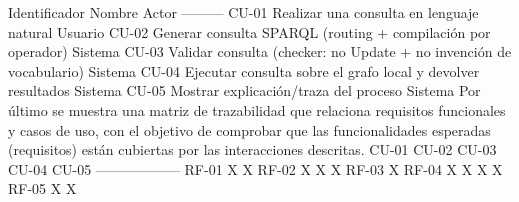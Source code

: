 {}\markdownRendererInterblockSeparator
{}\markdownRendererPipe{} Identificador \markdownRendererPipe{} Nombre \markdownRendererPipe{} Actor \markdownRendererPipe{} \markdownRendererPipe{}---\markdownRendererPipe{}---\markdownRendererPipe{}---\markdownRendererPipe{} \markdownRendererPipe{} CU-01 \markdownRendererPipe{} Realizar una consulta en lenguaje natural \markdownRendererPipe{} Usuario \markdownRendererPipe{} \markdownRendererPipe{} CU-02 \markdownRendererPipe{} Generar consulta SPARQL (routing + compilación por operador) \markdownRendererPipe{} Sistema \markdownRendererPipe{} \markdownRendererPipe{} CU-03 \markdownRendererPipe{} Validar consulta (checker: no Update + no invención de vocabulario) \markdownRendererPipe{} Sistema \markdownRendererPipe{} \markdownRendererPipe{} CU-04 \markdownRendererPipe{} Ejecutar consulta sobre el grafo local y devolver resultados \markdownRendererPipe{} Sistema \markdownRendererPipe{} \markdownRendererPipe{} CU-05 \markdownRendererPipe{} Mostrar explicación/traza del proceso \markdownRendererPipe{} Sistema \markdownRendererPipe{}\markdownRendererInterblockSeparator
{}\markdownRendererInterblockSeparator
{}Por último se muestra una matriz de trazabilidad que relaciona requisitos funcionales y casos de uso, con el objetivo de comprobar que las funcionalidades esperadas (requisitos) están cubiertas por las interacciones descritas.\markdownRendererInterblockSeparator
{}\markdownRendererInterblockSeparator
{}\markdownRendererPipe{} \markdownRendererPipe{} CU-01 \markdownRendererPipe{} CU-02 \markdownRendererPipe{} CU-03 \markdownRendererPipe{} CU-04 \markdownRendererPipe{} CU-05 \markdownRendererPipe{} \markdownRendererPipe{}---\markdownRendererPipe{}---\markdownRendererPipe{}---\markdownRendererPipe{}---\markdownRendererPipe{}---\markdownRendererPipe{}---\markdownRendererPipe{} \markdownRendererPipe{} RF-01 \markdownRendererPipe{} X \markdownRendererPipe{} X \markdownRendererPipe{} \markdownRendererPipe{} \markdownRendererPipe{} \markdownRendererPipe{} \markdownRendererPipe{} RF-02 \markdownRendererPipe{} X \markdownRendererPipe{} X \markdownRendererPipe{} \markdownRendererPipe{} X \markdownRendererPipe{} \markdownRendererPipe{} \markdownRendererPipe{} RF-03 \markdownRendererPipe{} \markdownRendererPipe{} \markdownRendererPipe{} X \markdownRendererPipe{} \markdownRendererPipe{} \markdownRendererPipe{} \markdownRendererPipe{} RF-04 \markdownRendererPipe{} \markdownRendererPipe{} X \markdownRendererPipe{} X \markdownRendererPipe{} X \markdownRendererPipe{} X \markdownRendererPipe{} \markdownRendererPipe{} RF-05 \markdownRendererPipe{} X \markdownRendererPipe{} \markdownRendererPipe{} \markdownRendererPipe{} \markdownRendererPipe{} X \markdownRendererPipe{}\markdownRendererInterblockSeparator
